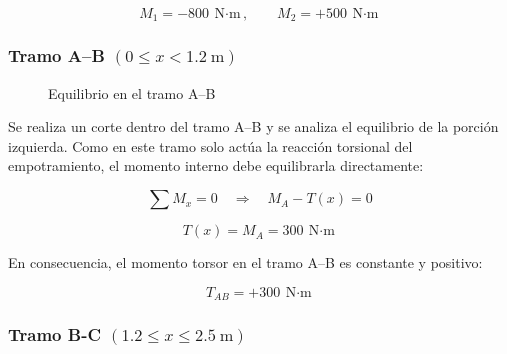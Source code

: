 \documentclass[12pt,a4paper]{article}
\begin{document}
\begin{enumerate}
\[
M_1=-800\ \text{N$\cdot$m},
\qquad
M_2=+500\ \text{N$\cdot$m}
\]

\subsubsection*{Tramo A--B \texorpdfstring{$(0 \leq x < 1.2\ \text{m})$}{(0 <= x < 1.2 m)}}

\begin{figure}[H]
\centering
{}
\caption{Equilibrio en el tramo A--B}
\end{figure}

Se realiza un corte dentro del tramo A--B y se analiza el equilibrio de la porción izquierda. Como en este tramo solo actúa la reacción torsional del empotramiento, el momento interno debe equilibrarla directamente:

\begin{equation}
\sum M_x=0 \quad \Rightarrow \quad M_A-T(x)=0
\end{equation}

\begin{equation}
T(x)=M_A=300\ \text{N$\cdot$m}
\end{equation}

En consecuencia, el momento torsor en el tramo A--B es constante y positivo:

\begin{equation}
\boxed{T_{AB}=+300\ \text{N$\cdot$m}}
\end{equation}

\subsubsection*{Tramo B-C \texorpdfstring{$(1.2 \leq x \leq 2.5\ \text{m})$}{(1.2 <= x <= 2.5 m)}}


\end{enumerate}
\end{document}
